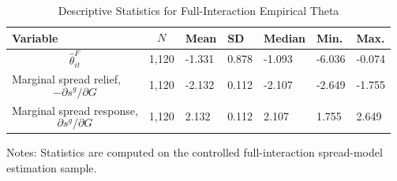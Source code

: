 \begin{table}[H]\centering
\begin{threeparttable}
\caption{Descriptive Statistics for Full-Interaction Empirical Theta}
\label{tab:theta_descriptive_stats}
\scriptsize
\begin{tabularx}{\textwidth}{lYYYYYY}
\toprule
Variable & $$N$$ & Mean & SD & Median & Min. & Max. \\
\midrule
$$\widehat{\theta}^{F}_{it}$$ & 1,120 & -1.331 & 0.878 & -1.093 & -6.036 & -0.074 \\
Marginal spread relief, $$-\partial s^g/\partial G$$ & 1,120 & -2.132 & 0.112 & -2.107 & -2.649 & -1.755 \\
Marginal spread response, $$\partial s^g/\partial G$$ & 1,120 & 2.132 & 0.112 & 2.107 & 1.755 & 2.649 \\
\bottomrule
\end{tabularx}
\begin{tablenotes}[flushleft]\footnotesize
\item Notes: Statistics are computed on the controlled full-interaction spread-model estimation sample.
\end{tablenotes}
\end{threeparttable}
\end{table}
